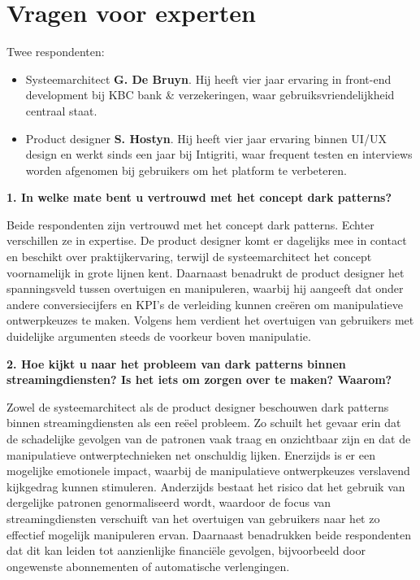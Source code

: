 \vspace{1em}


\section{Vragen voor experten}
\label{sec:interviews-experten}

Twee respondenten:

\begin{itemize}
    \item Systeemarchitect \textbf{G. De Bruyn}. Hij heeft vier jaar ervaring in front-end development bij KBC bank \& verzekeringen, waar gebruiksvriendelijkheid centraal staat.
    \item Product designer \textbf{S. Hostyn}. Hij heeft vier jaar ervaring binnen UI/UX design en werkt sinds een jaar bij Intigriti, waar frequent testen en interviews worden afgenomen bij gebruikers om het platform te verbeteren. 
\end{itemize}

\vspace{1em}

\textbf{1. In welke mate bent u vertrouwd met het concept dark patterns?}

Beide respondenten zijn vertrouwd met het concept dark patterns. Echter verschillen ze in expertise. De product designer komt er dagelijks mee in contact en beschikt over praktijkervaring, terwijl de systeemarchitect het concept voornamelijk in grote lijnen kent. Daarnaast benadrukt de product designer het spanningsveld tussen overtuigen en manipuleren, waarbij hij aangeeft dat onder andere conversiecijfers en KPI's de verleiding kunnen creëren om manipulatieve ontwerpkeuzes te maken. Volgens hem verdient het overtuigen van gebruikers met duidelijke argumenten steeds de voorkeur boven manipulatie.

\vspace{1em}

\textbf{2. Hoe kijkt u naar het probleem van dark patterns binnen streamingdiensten? Is het iets om zorgen over te maken? Waarom?}

Zowel de systeemarchitect als de product designer beschouwen dark patterns binnen streamingdiensten als een reëel probleem. Zo schuilt het gevaar erin dat de schadelijke gevolgen van de patronen vaak traag en onzichtbaar zijn en dat de manipulatieve ontwerptechnieken net onschuldig lijken. Enerzijds is er een mogelijke emotionele impact, waarbij de manipulatieve ontwerpkeuzes verslavend kijkgedrag kunnen stimuleren. Anderzijds bestaat het risico dat het gebruik van dergelijke patronen genormaliseerd wordt, waardoor de focus van streamingdiensten verschuift van het overtuigen van gebruikers naar het zo effectief mogelijk manipuleren ervan. Daarnaast benadrukken beide respondenten dat dit kan leiden tot aanzienlijke financiële gevolgen, bijvoorbeeld door ongewenste abonnementen of automatische verlengingen.

